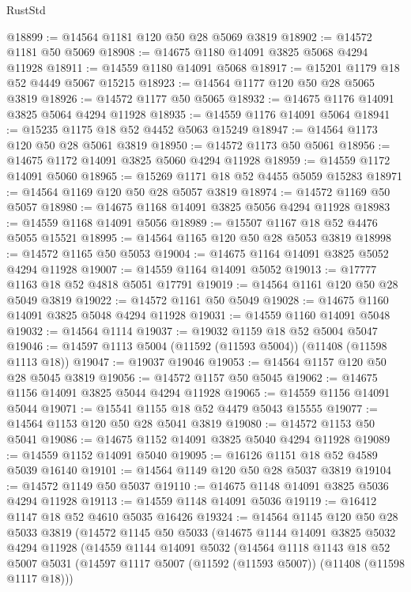 \begin{lexlean}{RustStd}
\begin{coremodule}
@18899 := @14564 @1181 @120 @50 @28 @5069 @3819
@18902 := @14572 @1181 @50 @5069
@18908 := @14675 @1180 @14091 @3825 @5068 @4294 @11928
@18911 := @14559 @1180 @14091 @5068
@18917 := @15201 @1179 @18 @52 @4449 @5067 @15215
@18923 := @14564 @1177 @120 @50 @28 @5065 @3819
@18926 := @14572 @1177 @50 @5065
@18932 := @14675 @1176 @14091 @3825 @5064 @4294 @11928
@18935 := @14559 @1176 @14091 @5064
@18941 := @15235 @1175 @18 @52 @4452 @5063 @15249
@18947 := @14564 @1173 @120 @50 @28 @5061 @3819
@18950 := @14572 @1173 @50 @5061
@18956 := @14675 @1172 @14091 @3825 @5060 @4294 @11928
@18959 := @14559 @1172 @14091 @5060
@18965 := @15269 @1171 @18 @52 @4455 @5059 @15283
@18971 := @14564 @1169 @120 @50 @28 @5057 @3819
@18974 := @14572 @1169 @50 @5057
@18980 := @14675 @1168 @14091 @3825 @5056 @4294 @11928
@18983 := @14559 @1168 @14091 @5056
@18989 := @15507 @1167 @18 @52 @4476 @5055 @15521
@18995 := @14564 @1165 @120 @50 @28 @5053 @3819
@18998 := @14572 @1165 @50 @5053
@19004 := @14675 @1164 @14091 @3825 @5052 @4294 @11928
@19007 := @14559 @1164 @14091 @5052
@19013 := @17777 @1163 @18 @52 @4818 @5051 @17791
@19019 := @14564 @1161 @120 @50 @28 @5049 @3819
@19022 := @14572 @1161 @50 @5049
@19028 := @14675 @1160 @14091 @3825 @5048 @4294 @11928
@19031 := @14559 @1160 @14091 @5048
@19032 := @14564 @1114
@19037 := @19032 @1159 @18 @52 @5004 @5047
@19046 := @14597 @1113 @5004 (@11592 (@11593 @5004)) (@11408 (@11598 @1113 @18))
@19047 := @19037 @19046
@19053 := @14564 @1157 @120 @50 @28 @5045 @3819
@19056 := @14572 @1157 @50 @5045
@19062 := @14675 @1156 @14091 @3825 @5044 @4294 @11928
@19065 := @14559 @1156 @14091 @5044
@19071 := @15541 @1155 @18 @52 @4479 @5043 @15555
@19077 := @14564 @1153 @120 @50 @28 @5041 @3819
@19080 := @14572 @1153 @50 @5041
@19086 := @14675 @1152 @14091 @3825 @5040 @4294 @11928
@19089 := @14559 @1152 @14091 @5040
@19095 := @16126 @1151 @18 @52 @4589 @5039 @16140
@19101 := @14564 @1149 @120 @50 @28 @5037 @3819
@19104 := @14572 @1149 @50 @5037
@19110 := @14675 @1148 @14091 @3825 @5036 @4294 @11928
@19113 := @14559 @1148 @14091 @5036
@19119 := @16412 @1147 @18 @52 @4610 @5035 @16426
@19324 := @14564
    @1145
    @120
    @50
    @28
    @5033
    @3819
    (@14572
      @1145
      @50
      @5033
      (@14675
        @1144
        @14091
        @3825
        @5032
        @4294
        @11928
        (@14559
          @1144
          @14091
          @5032
          (@14564
            @1118
            @1143
            @18
            @52
            @5007
            @5031
            (@14597 @1117 @5007 (@11592 (@11593 @5007)) (@11408 (@11598 @1117 @18)))

\end{coremodule}
\end{lexlean}
